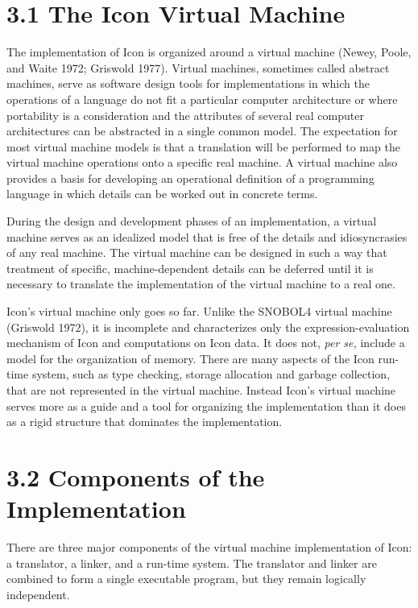 \section[3.1 The Icon Virtual Machine]{3.1 The Icon Virtual Machine}

The implementation of Icon is organized around a virtual machine
(Newey, Poole, and Waite 1972; Griswold 1977). Virtual machines,
sometimes called abstract machines, serve as software design tools for
implementations in which the operations of a language do not fit a
particular computer architecture or where portability is a
consideration and the attributes of several real computer
architectures can be abstracted in a single common model. The
expectation for most virtual machine models is that a translation will
be performed to map the virtual machine operations onto a specific
real machine. A virtual machine also provides a basis for developing
an operational definition of a programming language in which details
can be worked out in concrete terms.

During the design and development phases of an implementation, a
virtual machine serves as an idealized model that is free of the
details and idiosyncrasies of any real machine. The virtual machine
can be designed in such a way that treatment of specific,
machine-dependent details can be deferred until it is necessary to
translate the implementation of the virtual machine to a real one.

Icon's virtual machine only goes so far. Unlike the SNOBOL4 virtual
machine (Griswold 1972), it is incomplete and characterizes only the
expression-evaluation mechanism of Icon and computations on Icon
data. It does not, \textit{per se, }include a model for the
organization of memory. There are many aspects of the Icon run-time
system, such as type checking, storage allocation and garbage
collection, that are not represented in the virtual machine. Instead
Icon's virtual machine serves more as a guide and a tool for
organizing the implementation than it does as a rigid structure that
dominates the implementation.


\section[3.2 Components of the Implementation]{3.2 \textbf{Components of the Implementation}}

There are three major components of the virtual machine implementation
of Icon: a translator, a linker, and a run-time system. The translator
and linker are combined to form a single executable program, but they
remain logically independent.

